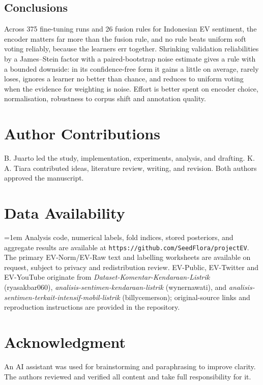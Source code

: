 \documentclass[conference,a4paper]{IEEEtran}
\begin{document}
\subsection{Conclusions}
Across 375 fine-tuning runs and 26 fusion rules for Indonesian EV sentiment, the encoder matters far more than the fusion rule, and no rule beats uniform soft voting reliably, because the learners err together. Shrinking validation reliabilities by a James--Stein factor with a paired-bootstrap noise estimate gives a rule with a bounded downside: in its confidence-free form it gains a little on average, rarely loses, ignores a learner no better than chance, and reduces to uniform voting when the evidence for weighting is noise. Effort is better spent on encoder choice, normalisation, robustness to corpus shift and annotation quality.

\section*{Author Contributions}
{\small B. Juarto led the study, implementation, experiments, analysis, and drafting. K. A. Tiara contributed ideas, literature review, writing, and revision. Both authors approved the manuscript.\par}

\section*{Data Availability}
{\small\raggedright\parindent=1em Analysis code, numerical labels, fold indices, stored posteriors, and aggregate results are available at \texttt{https://github.com/SeedFlora/projectEV}. The primary EV-Norm/EV-Raw text and labelling worksheets are available on request, subject to privacy and redistribution review. EV-Public, EV-Twitter and EV-YouTube originate from \emph{Dataset-Komentar-Kendaraan-Listrik} (ryasakbar060), \emph{analisis-sentimen-kendaraan-listrik} (wynernawati), and \emph{analisis-sentimen-terkait-intensif-mobil-listrik} (billycemerson); original-source links and reproduction instructions are provided in the repository.\par}

\section*{Acknowledgment}
{\small An AI assistant was used for brainstorming and paraphrasing to improve clarity. The authors reviewed and verified all content and take full responsibility for it.\par}


\end{document}
